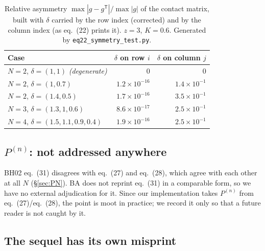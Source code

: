 \documentclass[11pt,a4paper]{article}
\newcommand{\eqBH}[1]{eq.~(#1)}
\newcommand{\code}[1]{\texttt{#1}}
\begin{document}
\begin{table}[htbp]
\centering
\small
\caption{Relative asymmetry $\max|g-g^{\mathsf T}|/\max|g|$ of the contact
matrix, built with $\delta$ carried by the row index (corrected) and by the
column index (as \eqBH{22} prints it). $z=3$, $K=0.6$. Generated by
\code{eq22\_symmetry\_test.py}.}
\label{tab:symmetry}
\begin{tabular}{@{}lrr@{}}
\toprule
Case & $\delta$ on row $i$ & $\delta$ on column $j$\\
\midrule
$N=2$, $\delta=(1,1)$ \emph{(degenerate)} & $0$ & $0$\\
$N=2$, $\delta=(1,0.7)$          & $1.2\times10^{-16}$ & $1.4\times10^{-1}$\\
$N=2$, $\delta=(1.4,0.5)$        & $1.7\times10^{-16}$ & $3.5\times10^{-1}$\\
$N=3$, $\delta=(1.3,1,0.6)$      & $8.6\times10^{-17}$ & $2.5\times10^{-1}$\\
$N=4$, $\delta=(1.5,1.1,0.9,0.4)$& $1.9\times10^{-16}$ & $2.5\times10^{-1}$\\
\bottomrule
\end{tabular}
\end{table}

\subsection{$P^{(n)}$: not addressed anywhere}

BH02 \eqBH{31} disagrees with \eqBH{27} and \eqBH{28}, which agree with each
other at all $N$ (\S\ref{sec:PN}). BA does not reprint \eqBH{31} in a
comparable form, so we have no external adjudication for it. Since our
implementation takes $P^{(n)}$ from \eqBH{27}/\eqBH{28}, the point is moot in
practice; we record it only so that a future reader is not caught by it.

\subsection{The sequel has its own misprint}
\end{document}
